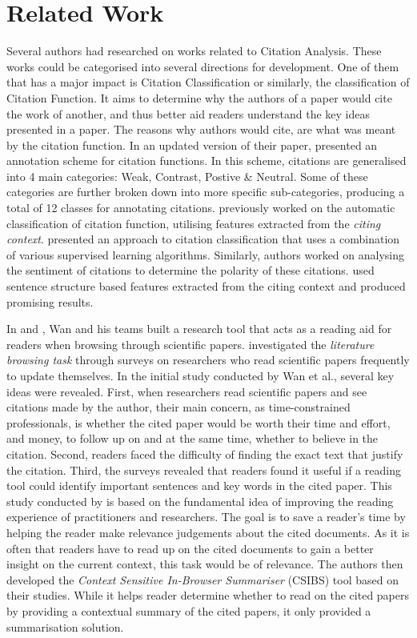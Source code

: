 \chapter{Related Work}
\label{Related Works}

Several authors had researched on works related to Citation Analysis. These works could be categorised into several directions for development. One of them that has a major impact is Citation Classification or similarly, the classification of Citation Function. It aims to determine why the authors of a paper would cite the work of another, and thus better aid readers understand the key ideas presented in a paper. The reasons why authors would cite, are what was meant by the citation function. In an updated version of their paper,  presented an annotation scheme for citation functions. In this scheme, citations are generalised into 4 main categories: Weak, Contrast, Postive \& Neutral. Some of these categories are further broken down into more specific sub-categories, producing a total of 12 classes for annotating citations.  previously worked on the automatic classification of citation function, utilising features extracted from the \textit{citing context}.  presented an approach to citation classification that uses a combination of various supervised learning algorithms. Similarly, authors worked on analysing the sentiment of citations to determine the polarity of these citations.  used sentence structure based features extracted from the citing context and produced promising results.

In \cite{citation-sensitive} and \cite{csibs}, Wan and his teams built a research tool that acts as a reading aid for readers when browsing through scientific papers.  investigated the \textit{literature browsing task} through surveys on researchers who read scientific papers frequently to update themselves. In the initial study conducted by Wan et al., several key ideas were revealed. First, when researchers read scientific papers and see citations made by the author, their main concern, as time-constrained professionals, is whether the cited paper would be worth their time and effort, and money, to follow up on and at the same time, whether to believe in the citation. Second, readers faced the difficulty of finding the exact text that justify the citation. Third, the surveys revealed that readers found it useful if a reading tool could identify important sentences and key words in the cited paper. This study conducted by  is based on the fundamental idea of improving the reading experience of practitioners and researchers. The goal is to save a reader's time by helping the reader make relevance judgements about the cited documents. As it is often that readers have to read up on the cited documents to gain a better insight on the current context, this task would be of relevance. The authors then developed the {\it Context Sensitive In-Browser Summariser} (CSIBS) tool based on their studies. While it helps reader determine whether to read on the cited papers by providing a contextual summary of the cited papers, it only provided a summarisation solution.

